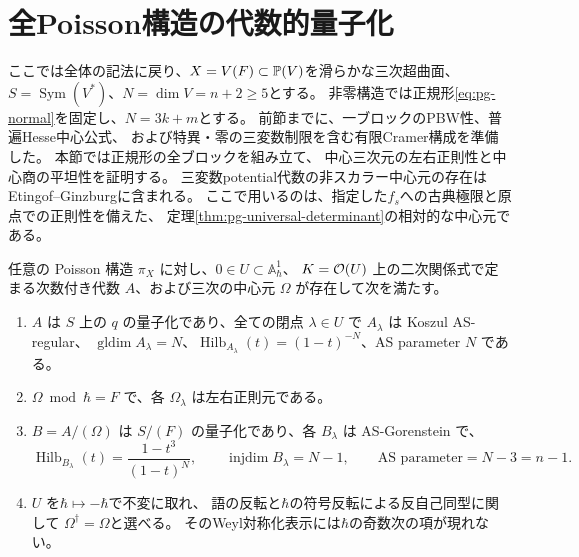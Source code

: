 \section{全Poisson構造の代数的量子化}
\label{sec:pg-quantization}
ここでは全体の記法に戻り、$X=V(F)\subset\mathbb P(V)$を滑らかな三次超曲面、
$S=\operatorname{Sym}(V^*)$、$N=\dim V=n+2\ge5$とする。
非零構造では正規形\eqref{eq:pg-normal}を固定し、$N=3k+m$とする。
前節までに、一ブロックのPBW性、普遍Hesse中心公式、
および特異・零の三変数制限を含む有限Cramer構成を準備した。
本節では正規形の全ブロックを組み立て、
中心三次元の左右正則性と中心商の平坦性を証明する。
三変数potential代数の非スカラー中心元の存在は
Etingof--Ginzburg\cite[Theorem~3.3.2(ii), p.~1385]{EG}に含まれる。
ここで用いるのは、指定した$f_s$への古典極限と原点での正則性を備えた、
定理\ref{thm:pg-universal-determinant}の相対的な中心元である。

\begin{theorem}[代数的量子化]\label{thm:pg-quantization}\label{pthm:quantization}
任意の Poisson 構造 $\pi_X$ に対し、$0\in U\subset\mathbb A^1_\hbar$、
$K=\mathcal O(U)$ 上の二次関係式で定まる次数付き代数 $A$、および三次の中心元 $\Omega$ が存在して次を満たす。
\begin{enumerate}
\item $A$ は $S$ 上の $q$ の量子化であり、全ての閉点 $\lambda\in U$ で
$A_\lambda$ は Koszul AS-regular、
$\operatorname{gldim}A_\lambda=N$、$\operatorname{Hilb}_{A_\lambda}(t)=(1-t)^{-N}$、AS parameter $N$ である。
\item $\Omega\bmod\hbar=F$ で、各 $\Omega_\lambda$ は左右正則元である。
\item $B=A/(\Omega)$ は $S/(F)$ の量子化であり、各 $B_\lambda$ は AS-Gorenstein で、
\begin{equation}
\operatorname{Hilb}_{B_\lambda}(t)=\frac{1-t^3}{(1-t)^N},\qquad
\operatorname{injdim}B_\lambda=N-1,\qquad
\text{AS parameter}=N-3=n-1.
\end{equation}
\item $U$ を$\hbar\mapsto-\hbar$で不変に取れ、
語の反転と$\hbar$の符号反転による反自己同型に関して
$\Omega^\dagger=\Omega$と選べる。
そのWeyl対称化表示には$\hbar$の奇数次の項が現れない。
\end{enumerate}
\end{theorem}

